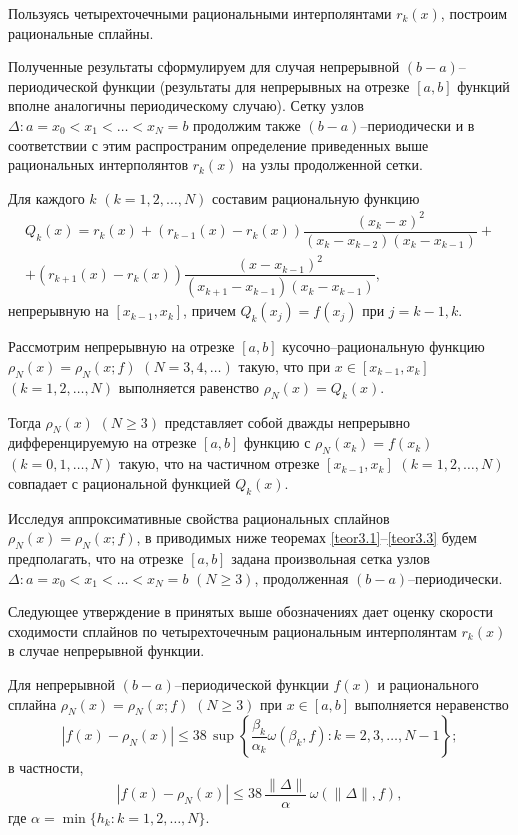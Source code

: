 Пользуясь  четырехточечными рациональными интерполянтами $r_k(x)$, построим
рациональные сплайны.


Полученные результаты сформулируем для случая непрерывной $(b-a)$--периодической функции
(результаты для непрерывных на отрезке $[a,b]$ функций вполне аналогичны периодическому случаю).
  Сетку узлов
 $\Delta: a=x_0<x_1<\dots<x_N=b$ продолжим также $(b-a)$--периодически и в соответствии
с этим распространим определение приведенных выше рациональных интерполянтов $r_k(x)$  на
узлы продолженной сетки.


Для каждого $k$ $(k=1,2,\dots,N)$ составим рациональную функцию
\begin{equation}\label{3.14}
\begin{array}{c}
Q_k(x)=r_k(x)+(r_{k-1}(x)-r_k(x))\dfrac{(x_k-x)^2}{(x_k-x_{k-2})(x_k-x_{k-1})}+\\
+(r_{k+1}(x)-r_k(x))\dfrac{(x-x_{k-1})^2}{(x_{k+1}-x_{k-1})(x_k-x_{k-1})},
\end{array}
\end{equation}
непрерывную на $[x_{k-1}, x_k]$, причем $Q_k(x_j)=f(x_j)$ при $j=k-1,k$.

Рассмотрим непрерывную на отрезке $[a,b]$ кусочно--рациональную функцию
$\rho_N(x)=\rho_N(x;f)$ $(N=3,4,\dots)$ такую, что при $x\in[x_{k-1}, x_k]$
$(k=1,2,\dots,N)$ выполняется равенство $\rho_N(x)=Q_k(x)$.


Тогда $\rho_N(x)$ $(N\geqslant 3)$ представляет собой дважды непрерывно дифференцируемую
на отрезке $[a,b]$ функцию с $\rho_N(x_k)=f(x_k)$ $(k=0,1,\dots,N)$
такую, что на частичном отрезке $[x_{k-1}, x_k]$ $(k=1,2,\dots, N)$ совпадает с рациональной функцией $Q_k(x)$.

Исследуя аппроксимативные свойства рациональных сплайнов $\rho_N(x)=\rho_N(x; f)$, в приводимых ниже
теоремах \ref{teor3.1}--\ref{teor3.3}
будем предполагать, что на отрезке $[a,b]$ задана произвольная сетка узлов
 $\Delta: a=x_0<x_1<\dots<x_N=b$ $(N\geqslant 3)$, продолженная $(b-a)$--периодически.

Следующее утверждение в принятых выше обозначениях дает оценку скорости сходимости сплайнов по
четырехточечным рациональным интерполянтам $r_k(x)$ в случае непрерывной функции.

\begin{theorem}\label{teor3.1}
Для непрерывной $(b-a)$--периодической функции $f(x)$ и рационального сплайна $\rho_N(x)=\rho_N(x;f)$
$(N\geqslant 3)$ при $x\in[a,b]$ выполняется неравенство
$$
|f(x)-\rho_N(x)|\leqslant 38\,\sup\left\{\frac{\beta_k}{\alpha_k}\omega(\beta_k, f):
 k=2,3,\dots, N-1\right\};
$$
в частности,
$$
|f(x)-\rho_N(x)|\leqslant 38\,\frac{\|\Delta\|}{\alpha}\,\omega(\|\Delta\|, f),
$$
где $\alpha=\min\{h_k: k=1, 2,\dots,N\}$.
\end{theorem}

